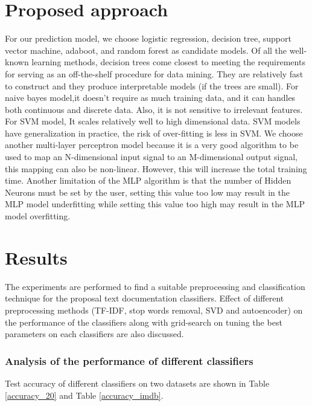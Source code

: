 \documentclass[11pt]{scrartcl}
\begin{document}
\section{Proposed approach}
For our prediction model, we choose logistic regression, decision tree, support vector machine, adaboot, and random forest as candidate models. Of all the well-known learning methods, decision trees come closest to meeting the requirements for serving as an off-the-shelf procedure for data mining. They are relatively fast to construct and they produce interpretable models (if the trees are small). For naive bayes model,it doesn’t require as much training data, and it can handles both continuous and discrete data. Also, it is not sensitive to irrelevant features. For SVM model, It scales relatively well to high dimensional data. SVM models have generalization in practice, the risk of over-fitting is less in SVM. We choose another multi-layer perceptron  model because it is a very good algorithm to be used to map an N-dimensional input signal to an M-dimensional output signal, this mapping can also be non-linear.  However, this will increase the total training time. Another limitation of the MLP algorithm is that the number of Hidden Neurons must be set by the user, setting this value too low may result in the MLP model underfitting while setting this value too high may result in the MLP model overfitting. 




\section{Results}

The experiments are performed to find a suitable preprocessing and classification technique for the proposal text documentation classifiers. Effect of different preprocessing methods (TF-IDF, stop words removal, SVD and autoencoder) on the performance of the classifiers along with grid-search on tuning the best parameters on each classifiers are also discussed.
\subsubsection*{Analysis of the performance of different classifiers}
Test accuracy of different classifiers on two datasets are shown in Table \ref{accuracy_20} and Table \ref{accuracy_imdb}.
\end{document}
